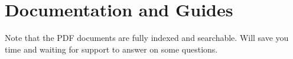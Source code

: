 \chapter{Documentation and Guides}\label{documentation-and-guides}

Note that the PDF documents are fully indexed and searchable. Will save you time and waiting for support to answer on some questions.
